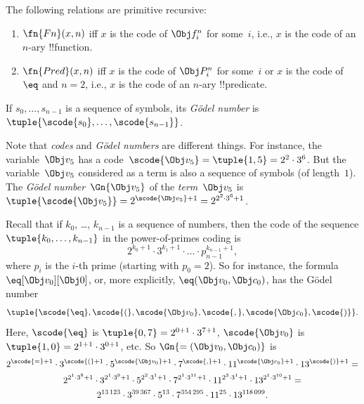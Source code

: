\documentclass[../../../include/open-logic-section]{subfiles}
\begin{document}
\begin{prop}
The following relations are primitive recursive:
\begin{enumerate}
\item $\fn{Fn}(x, n)$ iff $x$ is the code of $\Obj f^n_i$ for
  some~$i$, i.e., $x$ is the code of an $n$-ary !!{function}.
\item $\fn{Pred}(x, n)$ iff $x$ is the code of $\Obj P^n_i$ for
  some~$i$ or $x$ is the code of $\eq$ and $n = 2$, i.e., $x$ is the
  code of an $n$-ary !!{predicate}.
\end{enumerate}
\end{prop}

\begin{defn}
If $s_0, \dots, s_{n-1}$ is a sequence of symbols, its \emph{G\"odel
  number} is $\tuple{\scode{s_0}, \dots, \scode{s_{n-1}}}$.
\end{defn}

\begin{explain}
Note that \emph{codes} and \emph{G\"odel numbers} are different
things. For instance, the variable~$\Obj v_5$ has a code~$\scode{\Obj
  v_5} = \tuple{1, 5} = 2^2\cdot 3^6$. But the variable~$\Obj v_5$
considered as a term is also a sequence of symbols (of
length~$1$). The \emph{G\"odel number}~$\Gn{\Obj v_5}$ of the
\emph{term}~$\Obj v_5$ is $\tuple{\scode{\Obj v_5}} = 2^{\scode{\Obj
    v_5} + 1} = 2^{2^2\cdot 3^6 + 1}$.
\end{explain}

\begin{ex}
Recall that if $k_0$, \dots, $k_{n-1}$ is a sequence of numbers, then
the code of the sequence $\tuple{k_0, \dots, k_{n-1}}$ in the
power-of-primes coding is
\[
2^{k_0+1}\cdot3^{k_1+1}\cdot \dots \cdot p_{n-1}^{k_{n-1}+1},
\]
where $p_i$ is the $i$-th prime (starting with $p_0 = 2$). So for
instance, the formula $\eq[\Obj v_0][\Obj 0]$, or, more explicitly,
${\eq}(\Obj v_0,\Obj c_0)$, has the G\"odel number
\[
\tuple{\scode{\eq},\scode{(},\scode{\Obj v_0},\scode{,}, \scode{\Obj
    c_0},\scode{)}}.
\]
Here, $\scode{\eq}$ is $\tuple{0,7} = 2^{0+1}\cdot
3^{7+1}$, $\scode{\Obj v_0}$ is $\tuple{1,0} = 2^{1+1}\cdot3^{0+1}$,
etc. So $\Gn{=(\Obj v_0,\Obj c_0)}$ is
\begin{multline*}
2^{\scode{=} + 1}\cdot 3^{\scode{(}+1}\cdot 5^{\scode{\Obj v_0}+1}
\cdot 7^{\scode{,} + 1} \cdot 11^{\scode{\Obj c_0}+1} \cdot
13^{\scode{)}+1} = \\
2^{2^1\cdot 3^8 + 1}\cdot 3^{2^1\cdot 3^9+1}\cdot 5^{2^2\cdot 3^1+1}
\cdot 7^{2^1\cdot 3^{11} + 1} \cdot 11^{2^3\cdot3^1+1} \cdot
13^{2^1\cdot3^{10}+1} = \\
2^{13\,123}\cdot 3^{39\,367}\cdot 5^{13}\cdot 7^{354\,295}\cdot11^{25}\cdot13^{118\,099}.
\end{multline*}
\end{ex}
\end{document}
